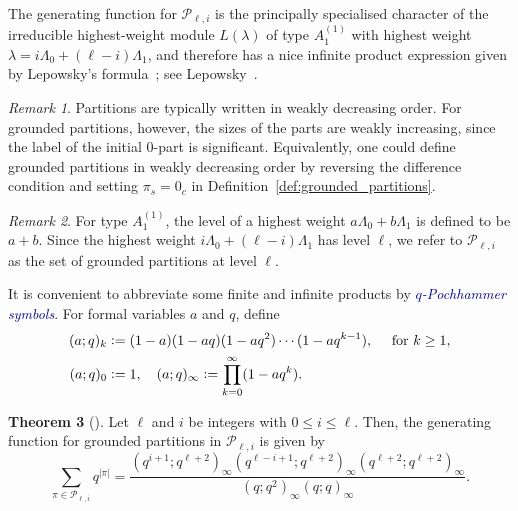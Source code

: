 \documentclass[11pt]{article}
\theoremstyle{definition}
\newtheorem{theorem}{Theorem}[section]
\theoremstyle{remark}
\newtheorem{remark}[theorem]{Remark}
\theoremstyle{definition}
\numberwithin{equation}{section}
\newcommand{\coloneq}{\mathrel{\mathop:}=}
\renewcommand\emph[1]{\textcolor{darkblue}{\it #1}}
\begin{document}
The generating function for \( \mathcal{P}_{\ell,i} \) is the
principally specialised character of the irreducible highest-weight
module \( L(\lambda) \) of type \( A_1^{(1)} \) with highest weight
\(\lambda=i\Lambda_0+(\ell-i)\Lambda_1 \), and therefore has a nice
infinite product expression given by Lepowsky’s formula~\cite{Lep78}; see Lepowsky~\cite[(24c), p.~144]{Lepowskyproduct}.


\begin{remark}\label{rem:2}
  Partitions are typically written in weakly decreasing order. For
  grounded partitions, however, the sizes of the parts are weakly
  increasing, since the label of the initial \( 0 \)-part is
  significant. Equivalently, one could define grounded partitions in
  weakly decreasing order by reversing the difference condition and
  setting \( \pi_s = 0_c \) in Definition~\ref{def:grounded_partitions}.
\end{remark}

\begin{remark}\label{rem:3}
  For type \( A_1^{(1)} \), the level of a highest weight
  \( a \Lambda_0 + b \Lambda_1 \) is defined to be \( a+b \). Since
  the highest weight \(i\Lambda_0+(\ell-i)\Lambda_1 \) has level
  \( \ell \), we refer to \( \mathcal{P}_{\ell,i} \) as the set of
  grounded partitions at level \( \ell \).
\end{remark}

It is convenient to abbreviate some finite and infinite products by \emph{$q$-Pochhammer symbols}. For formal variables $a$ and $q$, define
\begin{align*}
    (a;q)_k &\coloneq (1 - a)(1 - aq)(1 - aq^2) \cdots (1 - aq^{k-1}), \quad\text{ for \( k \geq 1 \)},\\
     (a;q)_0 &\coloneq 1, \quad (a;q)_\infty \coloneq \prod_{k=0}^{\infty} (1 - aq^k).
\end{align*}

\begin{theorem}[{\cite[Theorem~1.6]{DHK25}}]\label{thm:gf_grounded}
  Let \( \ell \) and \( i \) be integers with \( 0 \leq i \leq \ell \).
  Then, the generating function for grounded partitions in
  \( \mathcal{P}_{\ell,i} \) is given by
\[
  \sum_{\pi \in \mathcal{P}_{\ell, i}} q^{|\pi|} = \frac{(q^{i+1};q^{\ell+2})_\infty(q^{\ell-i+1};q^{\ell+2})_\infty(q^{\ell+2};q^{\ell+2})_\infty}{(q;q^2)_\infty (q;q)_\infty}.
\]
\end{theorem}
\end{document}
